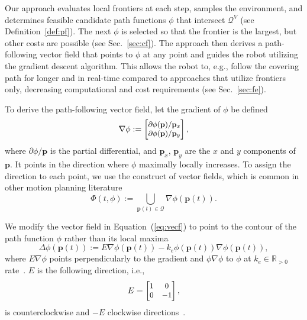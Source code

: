 \documentclass[lettersize,journal,twoside]{IEEEtran}
\theoremstyle{definition}
\begin{document}
Our 
approach evaluates local frontiers at each step, samples the environment, and determines feasible candidate path functions $\phi$ that intersect $\mathcal{Q}^V$ (see Definition~\ref{def:pf}).
The next $\phi$ is selected so that the frontier is the largest, but other costs are possible (see Sec.~\ref{sec:cf}). 
The %
approach then derives a path-following vector field that points to $\phi$ at any point and guides the robot utilizing the gradient descent algorithm. This allows the robot to, e.g., follow the covering path for longer and in real-time compared to approaches that utilize frontiers only, decreasing computational and cost requirements (see Sec.~\ref{sec:fe}).

To derive the path-following vector field, let the gradient of $\phi$ be defined
\begin{equation}\small
  \nabla\phi:=\begin{bmatrix}
    \partial\phi(\mathbf{p})/\mathbf{p}_x\\
    \partial\phi(\mathbf{p})/\mathbf{p}_y
  \end{bmatrix},
\end{equation}
where $\partial\phi/\mathbf{p}$ is the partial differential, and $\mathbf{p}_x$, $\mathbf{p}_y$ are the $x$ and $y$ components of $\mathbf{p}$.
It points in the direction where $\phi$ maximally locally increases. To assign the direction to each point, we use the construct of vector fields, which is common in other motion planning literature~\cite{%
garcia2017guidance,goncalves2010vector}
\begin{equation}\label{eq:vecf}
  \Phi(t,\phi):={\textstyle \bigcup\limits_{\mathbf{p}(t)\in\mathcal{Q}}}\nabla\phi(\mathbf{p}(t)).
\end{equation}

We modify the vector field in Equation~(\ref{eq:vecf}) to point to the contour of the path function $\phi$ rather than its local maxima
\begin{equation}\label{eq:pfvf}
  \Delta\phi(\mathbf{p}(t)):=E\nabla\phi(\mathbf{p}(t))-k_e\phi(\mathbf{p}(t))\nabla\phi(\mathbf{p}(t)),
\end{equation}
where $E\nabla\phi$ points perpendicularly to the gradient and $\phi\nabla\phi$ to $\phi$ at $k_e\in\mathbb{R}_{>0}$ rate~\cite{garcia2017guidance}. $E$ is the following direction, i.e.,
\begin{equation}\small
  E=\begin{bmatrix}
    1 & 0\\ 0 & -1
  \end{bmatrix},
\end{equation}
is counterclockwise and $-E$ clockwise directions~\cite{seewaldphdthesis}.
\end{document}
